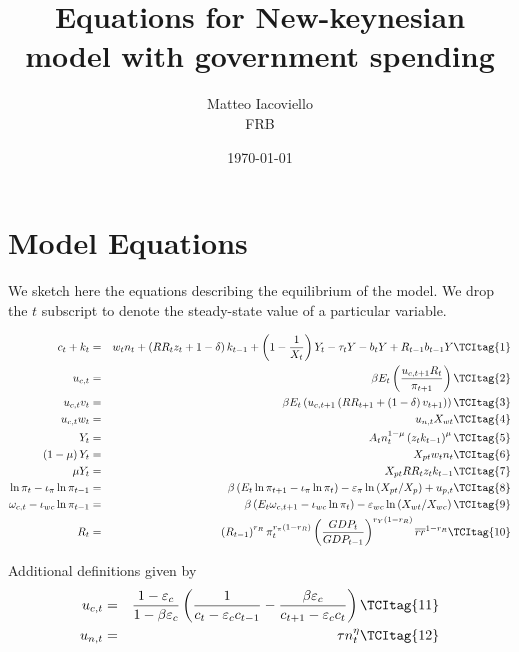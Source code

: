 \documentclass[thmsa,letterpaper]{article}
\begin{document}
\author{Matteo Iacoviello \\
FRB}
\title{Equations for New-keynesian model with government spending}
\date{%
\today%
}
\maketitle

\section{Model Equations}

We sketch here the equations describing the equilibrium of the model. We
drop the $t$ subscript to denote the steady-state value of a particular
variable.

\begin{eqnarray}
c_{t}+k_{t} &=&w_{t}n_{t}+\left( RR_{t}z_{t}+1-\delta \right) k_{t-1}+\left(
1-\frac{1}{X_{t}}\right) Y_{t}-\tau _{t}Y-b_{t}Y+R_{t-1}b_{t-1}Y  \TCItag{1}
\\
u_{c,t} &=&\beta E_{t}\left( \frac{u_{c,t+1}R_{t}}{\pi _{t+1}}\right)  
\TCItag{2} \\
u_{c,t}v_{t} &=&\beta E_{t}\left( u_{c,t+1}\left( RR_{t+1}+\left( 1-\delta
\right) v_{t+1}\right) \right)   \TCItag{3} \\
u_{c,t}w_{t} &=&u_{n,t}X_{wt}  \TCItag{4} \\
Y_{t} &=&A_{t}n_{t}^{1-\mu }\left( z_{t}k_{t-1}\right) ^{\mu }  \TCItag{5} \\
\left( 1-\mu \right) Y_{t} &=&X_{pt}w_{t}n_{t}  \TCItag{6} \\
\mu Y_{t} &=&X_{pt}RR_{t}z_{t}k_{t-1}  \TCItag{7} \\
\ln \pi _{t}-\iota _{\pi }\ln \pi _{t-1} &=&\beta \left( E_{t}\ln \pi
_{t+1}-\iota _{\pi }\ln \pi _{t}\right) -\varepsilon _{\pi }\ln \left(
X_{pt}/X_{p}\right) +u_{p,t}  \TCItag{8} \\
\omega _{c,t}-\iota _{wc}\ln \pi _{t-1} &=&\beta \left( E_{t}\omega
_{c,t+1}-\iota _{wc}\ln \pi _{t}\right) -\varepsilon _{wc}\ln \left(
X_{wt}/X_{wc}\right)   \TCItag{9} \\
R_{t} &=&\left( R_{t-1}\right) ^{r_{R}}\pi _{t}^{r_{\pi }\left(
1-r_{R}\right) }\left( \frac{GDP_{t}}{GDP_{t-1}}\right) ^{r_{Y}\left(
1-r_{R}\right) }\overline{rr}^{1-r_{R}}  \TCItag{10}
\end{eqnarray}

Additional definitions given by%
\begin{eqnarray}
u_{c,t} &=&\frac{1-\varepsilon _{c}}{1-\beta \varepsilon _{c}}\left( \frac{1%
}{c_{t}-\varepsilon _{c}c_{t-1}}-\frac{\beta \varepsilon _{c}}{%
c_{t+1}-\varepsilon _{c}c_{t}}\right)   \TCItag{11} \\
u_{n,t} &=&\tau n_{t}^{\eta }  \TCItag{12}
\end{eqnarray}
\end{document}
